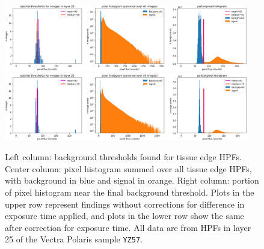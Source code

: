 \documentclass[letterpaper,11pt]{article}
\begin{document}
\begin{figure}[!ht]
\centering
\includegraphics[width=0.95\textwidth]{images/results/thresholding_pre_correction/YZ57_layer_25_background_threshold_plots}
\includegraphics[width=0.95\textwidth]{images/results/thresholding_post_correction/YZ57_layer_25_background_threshold_plots}
\caption{\footnotesize Left column: background thresholds found for tissue edge HPFs. Center column: pixel histogram summed over all tissue edge HPFs, with background in blue and signal in orange. Right column: portion of pixel histogram near the final background threshold. Plots in the upper row represent findings without corrections for difference in exposure time applied, and plots in the lower row show the same after correction for exposure time. All data are from HPFs in layer 25 of the Vectra Polaris sample \texttt{YZ57}.}
\label{fig:background_threshold_impact_polaris_layer_25}
\end{figure}
\end{document}
